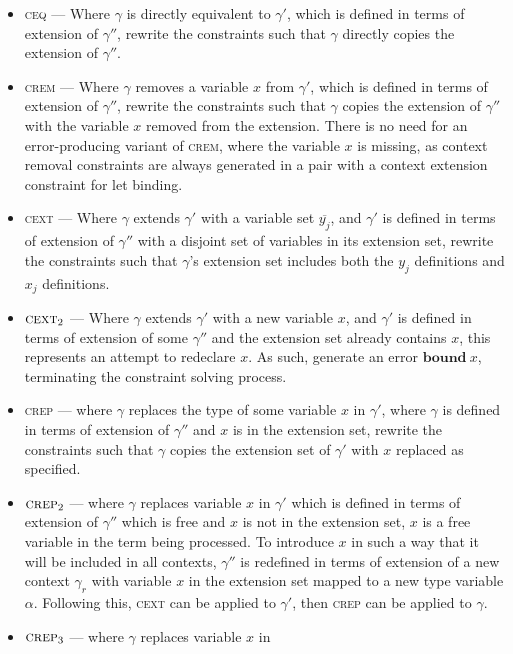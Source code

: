 \documentclass{article}
\begin{document}
\begin{itemize}
\item \textsc{ceq} --- Where $\gamma$ is directly equivalent
to $\gamma'$, which is defined in terms of extension of
$\gamma''$, rewrite the constraints such that
$\gamma$ directly copies the extension of $\gamma''$.
\item \textsc{crem} --- Where $\gamma$ removes a variable $x$ from $\gamma'$,
which is defined in terms of extension of $\gamma''$, rewrite the
constraints such that $\gamma$ copies the extension of $\gamma''$ with
the variable $x$ removed from the extension. There is no need for an
error-producing variant of \textsc{crem}, where the variable $x$ is missing, 
as context removal constraints are always generated in a pair with a context 
extension constraint for let binding.
\item \textsc{cext} --- Where $\gamma$ extends $\gamma'$ with
a variable set $\overline{y_j}$, and $\gamma'$ is defined in terms of extension of
$\gamma''$ with a disjoint set of variables in its extension set, rewrite the
constraints such that $\gamma$'s extension set includes both the $y_j$
definitions and $x_j$ definitions.
\item $\textsc{cext}_2$ --- Where $\gamma$ extends $\gamma'$ with
a new variable $x$, and $\gamma'$ is defined in terms of extension of
some $\gamma''$ and the extension set already contains $x$, this
represents an attempt to redeclare $x$. As such, generate an error
$\mathbf{bound}\:x$, terminating the constraint solving process.
\item \textsc{crep} --- where $\gamma$ replaces the type of some
variable $x$ in $\gamma'$, where $\gamma$ is defined in terms of extension
of $\gamma''$ and $x$ is in the extension set, rewrite the constraints
such that $\gamma$ copies the extension set of $\gamma'$ with $x$
replaced as specified.
\item $\textsc{crep}_2$ --- where $\gamma$ replaces variable $x$ in
$\gamma'$ which is defined in terms of extension of $\gamma''$
which is free and $x$ is not in the extension set, $x$ is a
free variable in the term being processed. To introduce $x$ in such a way that
it will be included in all contexts, $\gamma''$ is redefined in
terms of extension of a new context $\gamma_r$ with variable $x$
in the extension set mapped to a new type variable $\alpha$. Following
this, \textsc{cext} can be applied to $\gamma'$, then \textsc{crep} can
be applied to $\gamma$.
\item $\textsc{crep}_3$ --- where $\gamma$ replaces variable $x$ in

\end{itemize}
\end{document}
